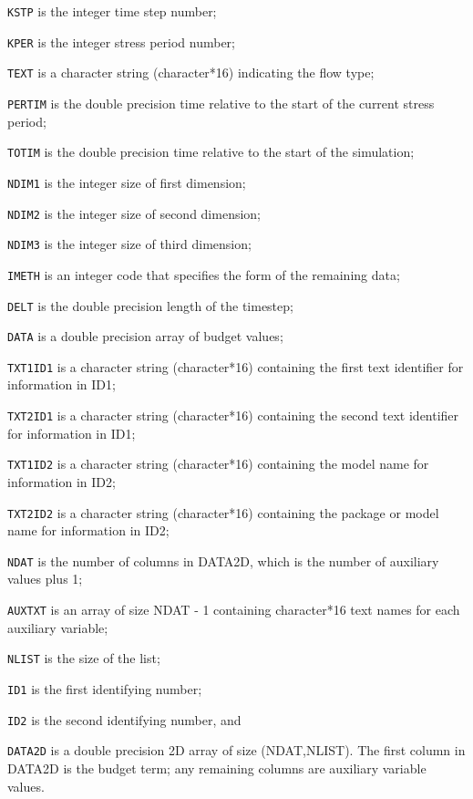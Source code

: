 \begin{description} \itemsep0pt \parskip0pt 
\item \texttt{KSTP} is the integer time step number;
\item \texttt{KPER} is the integer stress period number;
\item \texttt{TEXT} is a character string (character*16) indicating the flow type;
\item \texttt{PERTIM} is the double precision time relative to the start of the current stress period; 
\item \texttt{TOTIM} is the double precision time relative to the start of the simulation;
\item \texttt{NDIM1} is the integer size of first dimension; 
\item \texttt{NDIM2} is the integer size of second dimension;
\item \texttt{NDIM3} is the integer size of third dimension;
\item \texttt{IMETH} is an integer code that specifies the form of the remaining data;
\item \texttt{DELT} is the double precision length of the timestep;
\item \texttt{DATA} is a double precision array of budget values;
\item \texttt{TXT1ID1} is a character string (character*16) containing the first text identifier for information in ID1;
\item \texttt{TXT2ID1} is a character string (character*16) containing the second text identifier for information in ID1;
\item \texttt{TXT1ID2} is a character string (character*16) containing the model name for information in ID2;
\item \texttt{TXT2ID2} is a character string (character*16) containing the package or model name for information in ID2;
\item \texttt{NDAT} is the number of columns in DATA2D, which is the number of auxiliary values plus 1;
\item \texttt{AUXTXT} is an array of size NDAT - 1 containing character*16 text names for each auxiliary variable;
\item \texttt{NLIST} is the size of the list;
\item \texttt{ID1} is the first identifying number;
\item \texttt{ID2} is the second identifying number, and
\item \texttt{DATA2D} is a double precision 2D array of size (NDAT,NLIST).  The first column in DATA2D is the budget term; any remaining columns are auxiliary variable values.
\end{description}

